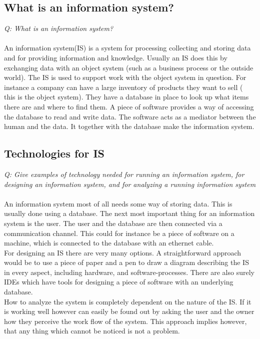 \documentclass{sig-alternate-05-2015}
\begin{document}
\subsection{What is an information system?}
{\it Q: What is an information system?}\\\\
An information system(IS) is a system for processing collecting and storing data and for providing information and knowledge\cite{dictIS}. Usually an IS does this by exchanging data with an object system (such as a business process or the outside world). The IS is used to support work with the object system in question. For instance a company can have a large inventory of products they want to sell ( this is the object system). They have a database in place to look up what items there are and where to find them. A piece of software provides a way of accessing the database to read and write data. The software acts as a mediator between the human and the data. It together with the database make the information system.

\subsection{Technologies for IS}
{\it Q: Give examples of technology needed for running an information system, for designing an information system, and for analyzing a running information system}\\\\
An information system most of all needs some way of storing data. This is usually done using a database. The next most important thing for an information system is the user. The user and the database are then connected via a communication channel. This could for instance be a piece of software on a machine, which is connected to the database with an ethernet cable.\\
For designing an IS there are very many options. A straightforward approach would be to use a piece of paper and a pen to draw a diagram describing the IS in every aspect, including hardware, and software-processes. There are also surely IDEs which have tools for designing a piece of software with an underlying database.\\
How to analyze the system is completely dependent on the nature of the IS. If it is working well however can easily be found out by asking the user and the owner how they perceive the work flow of the system. This approach implies however, that any thing which cannot be noticed is not a problem.
\end{document}
